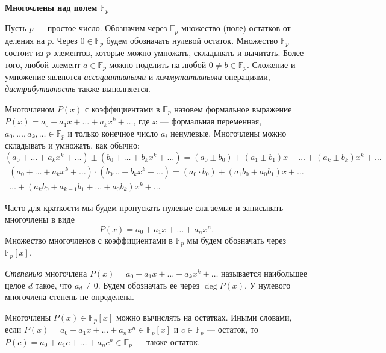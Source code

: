 \documentclass{article}
\begin{document}
\large
	

\begin{center}
\textbf{Многочлены над полем $\mathbb{F}_p$}
\end{center}

Пусть $p$ — простое число. Обозначим через $\mathbb{F}_p$ множество (поле) остатков от деления на $p$. Через $0 \in \mathbb{F}_p$ будем обозначать нулевой остаток. Множество $\mathbb{F}_p$ состоит из $p$ элементов, которые можно умножать, складывать и вычитать. Более того, любой элемент $a \in \mathbb{F}_p$ можно поделить на любой $0 \neq b \in \mathbb{F}_p$. Сложение и умножение являются \textit{ассоциативными} и \textit{коммутативными} операциями, \textit{дистрибутивность} также выполняется.

Многочленом $P(x)$ с коэффициентами в $\mathbb{F}_p$ назовем формальное выражение $P(x) = a_0 + a_1 x + \ldots + a_k x^k + \ldots$, где $x$ — формальная переменная, $a_0, \ldots, a_k, \ldots \in \mathbb{F}_p$ и только конечное число $a_i$ ненулевые. Многочлены можно складывать и умножать, как обычно:
\[
(a_0 + \ldots + a_k x^k + \ldots) \pm (b_0 + \ldots + b_k x^k + \ldots) = (a_0 \pm b_0) + (a_1 \pm b_1) x + \ldots + (a_k \pm b_k) x^k + \ldots
\]
\[
\begin{gathered}
(a_0 + \ldots + a_k x^k + \ldots) \cdot (b_0 \ldots + b_k x^k + \ldots) = (a_0 \cdot b_0) + (a_1 b_0 + a_0 b_1) x +\ldots \\ \ldots + (a_k b_0 + a_{k-1} b_1 + \ldots + a_0 b_k) x^k + \ldots
\end{gathered}
\]

Часто для краткости мы будем пропускать нулевые слагаемые и записывать многочлены в виде
\[
P(x) = a_0 + a_1 x + \ldots + a_n x^n.
\]
Множество многочленов с коэффициентами в $\mathbb{F}_p$ мы будем обозначать через $\mathbb{F}_p[x]$.

{\textit{Степенью}} многочлена $P(x) = a_0 + a_1 x + \ldots + a_k x^k + \ldots$ называется наибольшее целое $d$ такое, что $a_d \neq 0$. Будем обозначать ее через $\deg P(x)$. У нулевого многочлена степень не определена.

Многочлены $P(x) \in \mathbb{F}_p[x]$ можно вычислять на остатках. Иными словами, если $P(x) = a_0 + a_1 x + \ldots + a_n x^n \in \mathbb{F}_p[x]$ и $c \in \mathbb{F}_p$ — остаток, то $P(c) = a_0 + a_1 c + \ldots + a_n c^n \in \mathbb{F}_p$ — также остаток.
\end{document}
